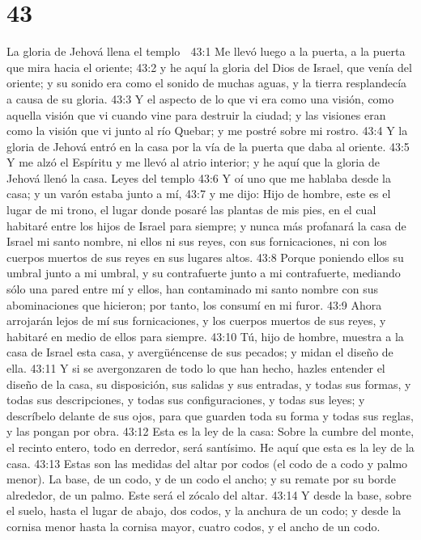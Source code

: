 \chapter{43}

La gloria de Jehová llena el templo  

43:1 Me llevó luego a la puerta, a la puerta que mira hacia el oriente;  
43:2 y he aquí la gloria del Dios de Israel, que venía del oriente; y su sonido era como el sonido de muchas aguas, y la tierra resplandecía a causa de su gloria.  
43:3 Y el aspecto de lo que vi era como una visión, como aquella visión que vi cuando vine para destruir la ciudad; y las visiones eran como la visión que vi junto al río Quebar; y me postré sobre mi rostro.  
43:4 Y la gloria de Jehová entró en la casa por la vía de la puerta que daba al oriente.  
43:5 Y me alzó el Espíritu y me llevó al atrio interior; y he aquí que la gloria de Jehová llenó la casa.  
Leyes del templo  
43:6 Y oí uno que me hablaba desde la casa; y un varón estaba junto a mí,  
43:7 y me dijo: Hijo de hombre, este es el lugar de mi trono, el lugar donde posaré las plantas de mis pies, en el cual habitaré entre los hijos de Israel para siempre; y nunca más profanará la casa de Israel mi santo nombre, ni ellos ni sus reyes, con sus fornicaciones, ni con los cuerpos muertos de sus reyes en sus lugares altos.  
43:8 Porque poniendo ellos su umbral junto a mi umbral, y su contrafuerte junto a mi contrafuerte, mediando sólo una pared entre mí y ellos, han contaminado mi santo nombre con sus abominaciones que hicieron; por tanto, los consumí en mi furor.  
43:9 Ahora arrojarán lejos de mí sus fornicaciones, y los cuerpos muertos de sus reyes, y habitaré en medio de ellos para siempre.  
43:10 Tú, hijo de hombre, muestra a la casa de Israel esta casa, y avergüéncense de sus pecados; y midan el diseño de ella.  
43:11 Y si se avergonzaren de todo lo que han hecho, hazles entender el diseño de la casa, su disposición, sus salidas y sus entradas, y todas sus formas, y todas sus descripciones, y todas sus configuraciones, y todas sus leyes; y descríbelo delante de sus ojos, para que guarden toda su forma y todas sus reglas, y las pongan por obra.  
43:12 Esta es la ley de la casa: Sobre la cumbre del monte, el recinto entero, todo en derredor, será santísimo. He aquí que esta es la ley de la casa.  
43:13 Estas son las medidas del altar por codos   (el codo de a codo y palmo menor). La base, de un codo, y de un codo el ancho; y su remate por su borde alrededor, de un palmo. Este será el zócalo del altar.  
43:14 Y desde la base, sobre el suelo, hasta el lugar de abajo, dos codos,  y la anchura de un codo; y desde la cornisa menor hasta la cornisa mayor, cuatro codos, y el ancho de un codo.  
